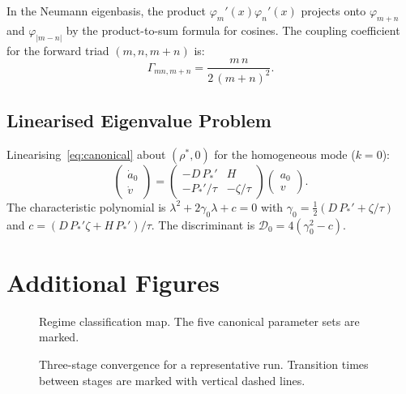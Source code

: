 \documentclass[11pt,twoside,openright]{book}
\theoremstyle{definition}
\theoremstyle{plain}
\theoremstyle{definition}
\theoremstyle{remark}
\newcommand{\rhostar}{\rho^{*}}
\newcommand{\Disc}{\mathscr{D}_0}
\begin{document}
In the Neumann eigenbasis, the product \(\varphi_m'(x)\varphi_n'(x)\) projects onto \(\varphi_{m+n}\) and \(\varphi_{|m-n|}\) by the product-to-sum formula for cosines. The coupling coefficient for the forward triad \((m, n, m+n)\) is:
\begin{equation}\label{eq:Gamma}
\Gamma_{mn,m+n} = \frac{m\,n}{2\,(m+n)^2}.
\end{equation}

\section{Linearised Eigenvalue Problem}

Linearising~\eqref{eq:canonical} about \((\rhostar, 0)\) for the homogeneous mode (\(k = 0\)):
\begin{equation}\label{eq:linearised}
\begin{pmatrix} \dot{a}_0 \\ \dot{v} \end{pmatrix} = \begin{pmatrix} -D\,P_*' & H \\ -P_*'/\tau & -\zeta/\tau \end{pmatrix} \begin{pmatrix} a_0 \\ v \end{pmatrix}.
\end{equation}
The characteristic polynomial is \(\lambda^2 + 2\gamma_0\lambda + c = 0\) with \(\gamma_0 = \frac{1}{2}(D\,P_*' + \zeta/\tau)\) and \(c = (D\,P_*'\zeta + H\,P_*')/\tau\). The discriminant is \(\Disc = 4(\gamma_0^2 - c)\).


\chapter{Additional Figures}\label{app:figures}

\begin{figure}[ht]
\centering
{}
\caption{Regime classification map. The five canonical parameter sets are marked.}
\label{fig:regime-map}
\end{figure}

\begin{figure}[ht]
\centering
{}
\caption{Three-stage convergence for a representative run. Transition times between stages are marked with vertical dashed lines.}
\label{fig:three-stage}
\end{figure}
\end{document}
